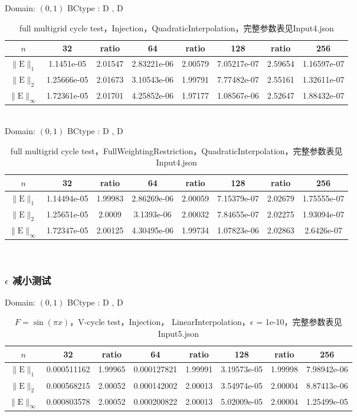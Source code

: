 \documentclass[a4paper,twoside]{ctexart}
\begin{document}
\noindent Domain: $(0,1)$
BCtype : D , D
\begin{table}[htbp]
\centering\begin{tabular}{c|ccccccc}
\hline
$n$&32&ratio&64&ratio&128&ratio&256\\
\hline
$\|\mathrm{E}\|_1$&1.1451e-05&2.01547&2.83221e-06&2.00579&7.05217e-07&2.59654&1.16597e-07\\
\hline
$\|\mathrm{E}\|_2$&1.25666e-05&2.01673&3.10543e-06&1.99791&7.77482e-07&2.55161&1.32611e-07\\
\hline
$\|\mathrm{E}\|_{\infty}$&1.72361e-05&2.01701&4.25852e-06&1.97177&1.08567e-06&2.52647&1.88432e-07\\
\hline
\end{tabular}
\caption{full multigrid cycle test，Injection，QuadraticInterpolation，完整参数表见Input4.json}
\end{table}\\

\noindent Domain: $(0,1)$
BCtype : D , D
\begin{table}[htbp]
\centering\begin{tabular}{c|ccccccc}
\hline
$n$&32&ratio&64&ratio&128&ratio&256\\
\hline
$\|\mathrm{E}\|_1$&1.14494e-05&1.99983&2.86269e-06&2.00059&7.15379e-07&2.02679&1.75555e-07\\
\hline
$\|\mathrm{E}\|_2$&1.25651e-05&2.0009&3.1393e-06&2.00032&7.84655e-07&2.02275&1.93094e-07\\
\hline
$\|\mathrm{E}\|_{\infty}$&1.72347e-05&2.00125&4.30495e-06&1.99734&1.07823e-06&2.02863&2.6426e-07\\
\hline
\end{tabular}
\caption{full multigrid cycle test，FullWeightingRestriction，QuadraticInterpolation，完整参数表见Input4.json}
\end{table}\\

\subsubsection{$\epsilon$ 减小测试}

\noindent Domain: $(0,1)$
BCtype : D , D
\begin{table}[htbp]
\centering\begin{tabular}{c|ccccccc}
\hline
$n$&32&ratio&64&ratio&128&ratio&256\\
\hline
$\|\mathrm{E}\|_1$&0.000511162&1.99965&0.000127821&1.99991&3.19573e-05&1.99998&7.98942e-06\\
\hline
$\|\mathrm{E}\|_2$&0.000568215&2.00052&0.000142002&2.00013&3.54974e-05&2.00004&8.87413e-06\\
\hline
$\|\mathrm{E}\|_{\infty}$&0.000803578&2.00052&0.000200822&2.00013&5.02009e-05&2.00004&1.25499e-05\\
\hline
\end{tabular}
\caption{$F = \sin(\pi x)$，V-cycle test，Injection，
  LinearInterpolation，$\epsilon$ = 1e-10，完整参数表见Input5.json}
\end{table}
\end{document}
